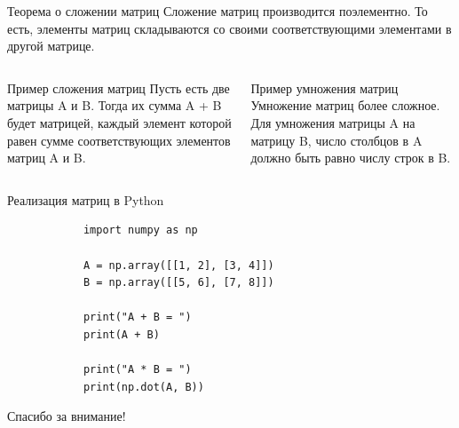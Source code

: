 \documentclass[mathserif, serif, 11pt]{beamer}
\begin{document}
	\begin{frame}
		\begin{block}{Теорема о сложении матриц}
			Сложение матриц производится поэлементно. То есть, элементы матриц складываются со своими соответствующими элементами в другой матрице.
		\end{block}
		
		\begin{columns}
			\begin{column}{5cm}
				\begin{block}{Пример сложения матриц}
					Пусть есть две матрицы A и B. Тогда их сумма A + B будет матрицей, каждый элемент которой равен сумме соответствующих элементов матриц A и B.
				\end{block}
			\end{column}
			\begin{column}{5cm}
				\begin{block}{Пример умножения матриц}
					Умножение матриц более сложное. Для умножения матрицы A на матрицу B, число столбцов в A должно быть равно числу строк в B.
				\end{block}
			\end{column}
		\end{columns}
	\end{frame}
	
	
	\begin{frame}[fragile]{Реализация матриц в Python}
		\begin{verbatim}
			import numpy as np
			
			A = np.array([[1, 2], [3, 4]])
			B = np.array([[5, 6], [7, 8]])
			
			print("A + B = ")
			print(A + B)
			
			print("A * B = ")
			print(np.dot(A, B))
		\end{verbatim}
	\end{frame}
	
	\begin{frame}
		\begin{center}
			\LARGE
			Спасибо за внимание!
		\end{center}
	\end{frame}
\end{document}
